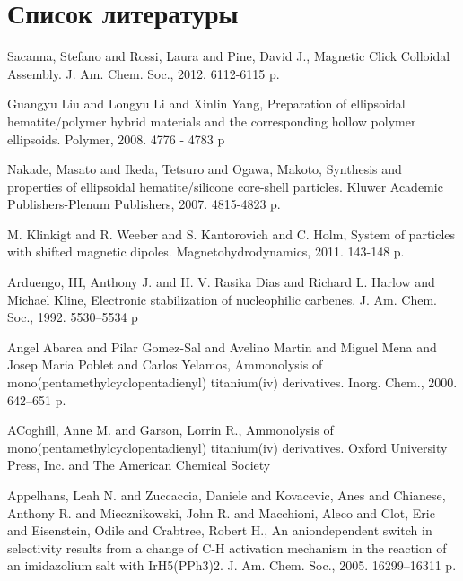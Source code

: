 \documentclass[a4paper,14pt]{extarticle}
\begin{document}
    \section*{Список литературы}

    \begingroup
    \renewcommand{\section}[2]{}%
    \begin{thebibliography}{99}

        Sacanna, Stefano and Rossi, Laura and Pine, David J., Magnetic Click Colloidal Assembly. J. Am. Chem. Soc., 2012. 6112-6115 p.

        Guangyu Liu and Longyu Li and Xinlin Yang, Preparation of ellipsoidal hematite/polymer hybrid materials and the corresponding hollow polymer ellipsoids. Polymer, 2008. 4776 - 4783 p

        Nakade, Masato and Ikeda, Tetsuro and Ogawa, Makoto, Synthesis and properties of ellipsoidal hematite/silicone core-shell particles. Kluwer Academic Publishers-Plenum Publishers, 2007. 4815-4823 p.

        M. Klinkigt and R. Weeber and S. Kantorovich and C. Holm, System of particles with shifted magnetic dipoles. Magnetohydrodynamics, 2011. 143-148 p.

        Arduengo, III, Anthony J. and H. V. Rasika Dias and Richard L. Harlow and Michael Kline, Electronic stabilization of nucleophilic carbenes. J. Am. Chem. Soc., 1992. 5530–5534 p

        Angel Abarca and Pilar Gomez-Sal and Avelino Martin and Miguel Mena and Josep Maria Poblet and Carlos Yelamos, Ammonolysis of mono(pentamethylcyclopentadienyl) titanium(iv) derivatives. Inorg. Chem., 2000. 642–651 p.

        ACoghill, Anne M. and Garson, Lorrin R., Ammonolysis of mono(pentamethylcyclopentadienyl) titanium(iv) derivatives. Oxford University Press, Inc. and The American Chemical Society

        Appelhans, Leah N. and Zuccaccia, Daniele and Kovacevic, Anes and Chianese, Anthony R. and Miecznikowski, John R. and Macchioni, Aleco and Clot, Eric and Eisenstein, Odile and Crabtree, Robert H., An aniondependent switch in selectivity results from a change of C-H activation mechanism in the reaction of an imidazolium salt with IrH5(PPh3)2. J. Am. Chem. Soc., 2005. 16299–16311 p.


\end{thebibliography}
\end{document}
